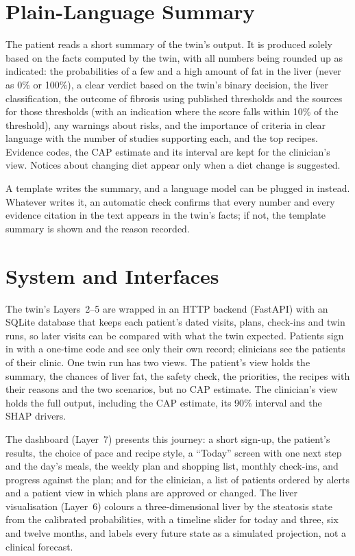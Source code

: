 \section{Plain-Language Summary}
\label{sec:m_summary}

The patient reads a short summary of the twin's output. It is produced solely 
based on the facts computed by the twin, with all numbers being rounded up as 
indicated: the probabilities of a few and a high amount of fat in the liver 
(never as 0\% or 100\%), a clear verdict based on the twin's binary decision, 
the liver classification, the outcome of fibrosis using published thresholds 
and the sources for those thresholds (with an indication where the score falls 
within 10\% of the threshold), any warnings about risks, and the importance of 
criteria in clear language with the number of studies supporting each, and the 
top recipes. Evidence codes, the CAP estimate and its interval are kept for the clinician's view.
Notices about changing diet appear only when a diet change is suggested.

A template writes the summary, and a language model can be plugged in
instead. Whatever writes it, an automatic check confirms that every number
and every evidence citation in the text appears in the twin's facts; if not,
the template summary is shown and the reason recorded.

\section{System and Interfaces}
\label{sec:m_system}

The twin's Layers~2--5 are wrapped in an HTTP backend (FastAPI) with an
SQLite database that keeps each patient's dated visits, plans, check-ins and
twin runs, so later visits can be compared with what the twin expected.
Patients sign in with a one-time code and see only their own record;
clinicians see the patients of their clinic. One twin run has two views. The
patient's view holds the summary, the chances of liver fat, the safety check,
the priorities, the recipes with their reasons and the two scenarios, but no
CAP estimate. The clinician's view holds the full output, including the CAP
estimate, its 90\% interval and the SHAP drivers.

The dashboard (Layer~7) presents this journey: a short sign-up, the patient's
results, the choice of pace and recipe style, a ``Today'' screen with one next
step and the day's meals, the weekly plan and shopping list, monthly
check-ins, and progress against the plan; and for the clinician, a list of
patients ordered by alerts and a patient view in which plans are approved or
changed. The liver visualisation (Layer~6) colours a three-dimensional liver
by the steatosis state from the calibrated probabilities, with a timeline
slider for today and three, six and twelve months, and labels every future
state as a simulated projection, not a clinical forecast.

